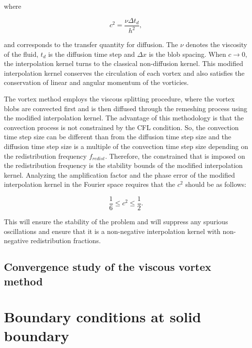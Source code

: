 where 

\begin{equation}
c^2 = \frac{\nu \Delta t_d}{h^2},
\label{eq:c2}
\end{equation}

and corresponds to the transfer quantity for diffusion. The $\nu$ denotes the viscosity of the fluid, $t_d$ is the diffusion time step and $\Delta x$ is the blob spacing. When $c \rightarrow 0$, the interpolation kernel turns to the classical non-diffusion kernel.  This modified interpolation kernel conserves the circulation of each vortex and also satisfies the conservation of linear and angular momentum of the vorticies.

The vortex method employs the viscous splitting procedure, where the vortex blobs are convected first and is then diffused through the remeshing process using the modified interpolation kernel. The advantage of this methodology is that the convection process is not constrained by the CFL condition. So, the convection time step size can be different than from the diffusion time step size and the diffusion time step size is a multiple of the convection time step size depending on the redistribution frequency $f_{redist}$. Therefore, the constrained that is imposed on the redistribution frequency is the stability bounds of the modified interpolation kernel. Analyzing the amplification factor and the phase error of the modified interpolation kernel in the Fourier space requires that the $c^2$ should be as follows:


\begin{equation}
\frac{1}{6} \le c^2 \le \frac{1}{2}.
\label{eq:c2stability}
\end{equation}

This will ensure the stability of the problem and will suppress any spurious oscillations and ensure that it is a non-negative interpolation kernel with non-negative redistribution fractions.

\subsection{Convergence study of the viscous vortex method}
\section{Boundary conditions at solid boundary}
\label{sec:boundaryConditions}

